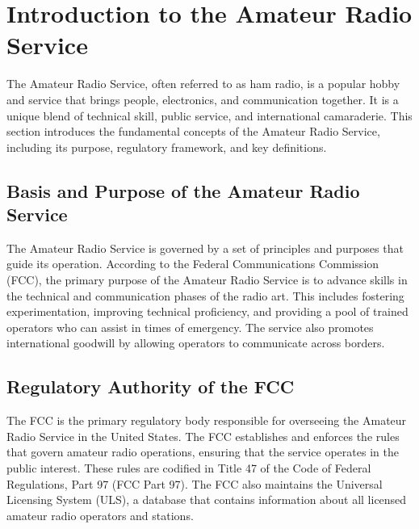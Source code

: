 \section{Introduction to the Amateur Radio Service}
\label{sec:intro_amateur_radio}

The Amateur Radio Service, often referred to as ham radio, is a popular hobby and service that brings people, electronics, and communication together. It is a unique blend of technical skill, public service, and international camaraderie. This section introduces the fundamental concepts of the Amateur Radio Service, including its purpose, regulatory framework, and key definitions.

\subsection*{Basis and Purpose of the Amateur Radio Service}
The Amateur Radio Service is governed by a set of principles and purposes that guide its operation. According to the Federal Communications Commission (FCC), the primary purpose of the Amateur Radio Service is to advance skills in the technical and communication phases of the radio art. This includes fostering experimentation, improving technical proficiency, and providing a pool of trained operators who can assist in times of emergency. The service also promotes international goodwill by allowing operators to communicate across borders.

\subsection*{Regulatory Authority of the FCC}
The FCC is the primary regulatory body responsible for overseeing the Amateur Radio Service in the United States. The FCC establishes and enforces the rules that govern amateur radio operations, ensuring that the service operates in the public interest. These rules are codified in Title 47 of the Code of Federal Regulations, Part 97 (FCC Part 97). The FCC also maintains the Universal Licensing System (ULS), a database that contains information about all licensed amateur radio operators and stations.

